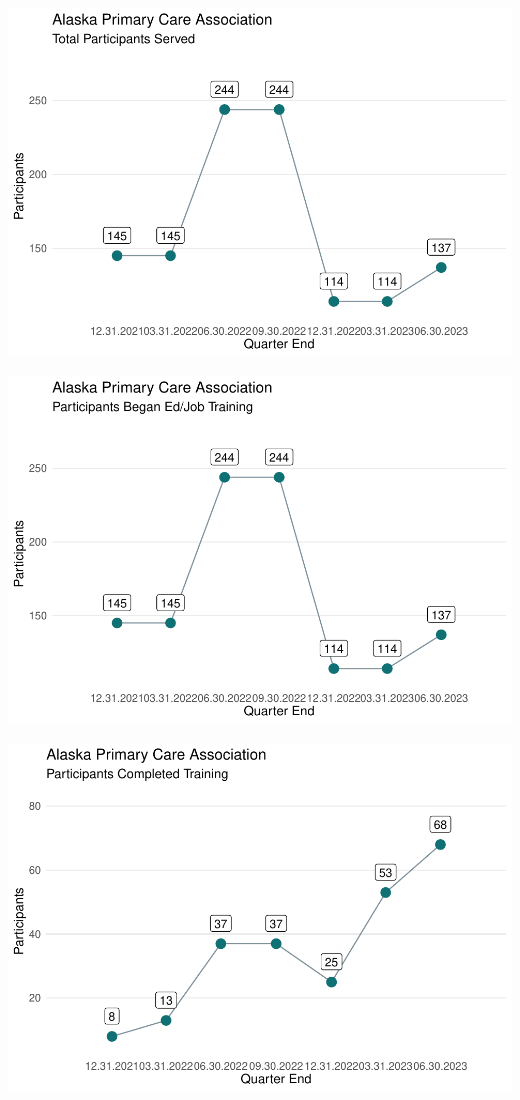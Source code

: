 \documentclass[
  landscape, table]{article}
\begin{document}
\includegraphics{rh_pdf_by_grantee_files/figure-latex/unnamed-chunk-4-1.pdf}

\includegraphics{rh_pdf_by_grantee_files/figure-latex/unnamed-chunk-5-1.pdf}

\includegraphics{rh_pdf_by_grantee_files/figure-latex/unnamed-chunk-6-1.pdf}
\end{document}
